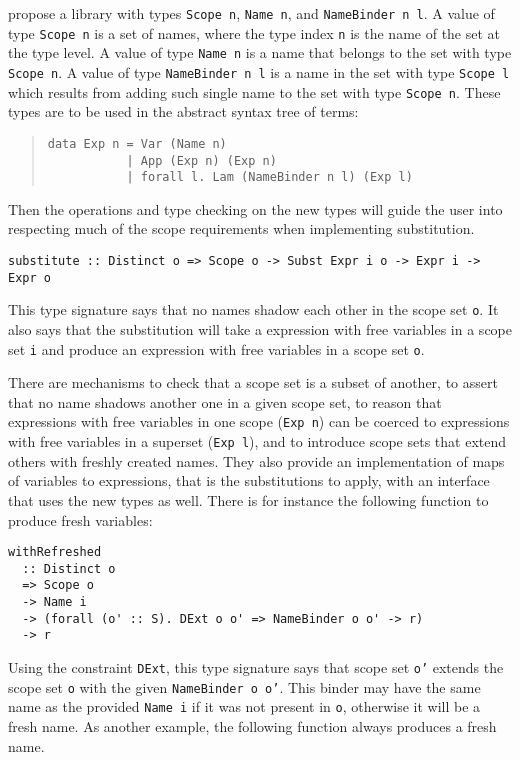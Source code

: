 \documentclass[sigconf, anonymous, review]{acmart}
\newcommand{\tc}[1]{{\small\texttt{#1}}}
\begin{document}
 propose a library with types \tc{Scope n}, \tc{Name n}, and
\tc{Name\-Binder n l}. A value of type \tc{Scope n} is a set of names, where
the type index \tc{n} is the name of the set at the type level. A value of type \tc{Name n} is a name that
belongs to the set with type \tc{Scope n}. A value of type \tc{NameBinder n l} is
a name in the set with type \tc{Scope l} which results from adding such single
name to the set with type \tc{Scope n}. These types are to be used in
the abstract syntax tree of terms:

\begin{quotation}
\begin{verbatim}
data Exp n = Var (Name n)
           | App (Exp n) (Exp n)
           | forall l. Lam (NameBinder n l) (Exp l)
\end{verbatim}
\end{quotation}

Then the operations and type checking on the new types will guide the user into
respecting much of the scope requirements when implementing substitution.

\begin{verbatim}
substitute :: Distinct o => Scope o -> Subst Expr i o -> Expr i -> Expr o
\end{verbatim}

This type signature says that no names shadow each other in the scope set \tc{o}.
It also says that the substitution will take a expression with free variables in
a scope set \tc{i} and produce an expression with free variables in a scope set
\tc{o}.

There
are mechanisms to check that a scope set is a subset of another, to assert that no
name shadows another one in a given scope set, to reason that expressions
with free variables in one scope (\tc{Exp n}) can be coerced to expressions with
free variables in a superset (\tc{Exp l}), and to introduce scope sets that extend
others with freshly created names. They also provide an implementation of maps of
variables to expressions, that is the substitutions to apply, with an interface
that uses the new types as well. There is for instance the following function to
produce fresh variables:

\begin{verbatim}
withRefreshed
  :: Distinct o
  => Scope o
  -> Name i
  -> (forall (o' :: S). DExt o o' => NameBinder o o' -> r)
  -> r
\end{verbatim}

Using the constraint \tc{DExt}, this type signature says that scope set \tc{o'}
extends the scope set \tc{o} with the given \tc{NameBinder o o'}. This binder
may have the same name as the provided \tc{Name i} if it was not present in
\tc{o}, otherwise it will be a fresh name. As another example, the following
function always produces a fresh name.
\end{document}
